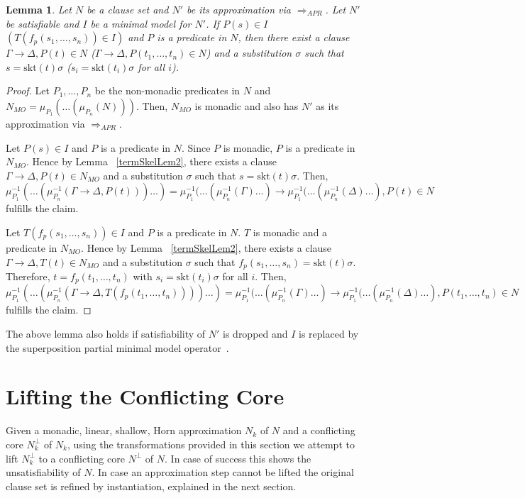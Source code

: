 \documentclass{llncs}
\newcommand{\imp}{\rightarrow}
\newcommand{\R}[1]{\mu^{-1}_{#1}}
\newcommand{\Proj}[1]{\mu_{#1}}
\newcommand{\skt}{\text{skt}}
\newcommand{\apr}{ \Rightarrow_{APR}}
\newtheorem{lem}[theorem]{Lemma}
\begin{document}
\begin{lem}\label{termSkelLem}
Let $N$ be a clause set and $N'$ be its approximation via  $\apr$. Let $N'$ be
satisfiable and $I$ be a minimal model for $N'$.
If $P(s) \in I$ $(T(f_p(s_1,\ldots,s_n))\in I)$ 
and $P$ is a predicate in $N$, then there exist a clause 
$\Gamma \imp \Delta,P(t) \in N$  ($\Gamma \imp \Delta,P(t_1,\ldots,t_n) \in N$)
and a substitution $\sigma$ such that
$s = \skt(t)\sigma$ ($s_i = \skt(t_i)\sigma$ for all $i$).
\end{lem}


\begin{proof}
Let $P_1,\ldots,P_n$ be the non-monadic predicates in $N$ and $N_{MO}=\Proj{P_1}(\ldots(\Proj{P_n}(N)))$. Then, $N_{MO}$ is monadic and also has $N'$ as its approximation via $\apr$.

 Let $P(s) \in I$ and $P$ is a predicate in $N$. Since $P$ is monadic, $P$ is a predicate in $N_{MO}$.
Hence by Lemma ~\ref{termSkelLem2}, there exists a clause $\Gamma \imp \Delta,P(t) \in N_{MO}$ 
and a substitution $\sigma$ such that $s = \skt(t)\sigma$. 
Then, $\R{P_1}(\ldots(\R{P_n}(\Gamma \imp \Delta,P(t)))\ldots)= \R{P_1}(\ldots(\R{P_n}(\Gamma)\ldots) \imp \R{P_1}(\ldots(\R{P_n}(\Delta)\ldots),P(t)\in N$ fulfills the claim.

Let $T(f_p(s_1,\ldots,s_n))\in I$ and $P$ is a predicate in $N$. $T$ is monadic and a predicate in $N_{MO}$.
Hence by Lemma ~\ref{termSkelLem2}, there exists a clause $\Gamma \imp \Delta,T(t) \in N_{MO}$ 
and a substitution $\sigma$ such that $f_p(s_1,\ldots,s_n) = \skt(t)\sigma$.
Therefore, $t=f_p(t_1,\ldots,t_n)$ with  $s_i = \skt(t_i)\sigma$ for all $i$.
Then, $\R{P_1}(\ldots(\R{P_n}(\Gamma \imp \Delta,T(f_p(t_1,\ldots,t_n))))\ldots)=\R{P_1}(\ldots(\R{P_n}(\Gamma)\ldots) \imp \R{P_1}(\ldots(\R{P_n}(\Delta)\ldots),P(t_1,\ldots,t_n) \in N$ fulfills the claim.
\end{proof}

The above lemma also holds if satisfiability of $N'$ is dropped and $I$ is replaced
by the superposition partial minimal model operator~\cite{Weidenbach01handbook}.


\section{Lifting the Conflicting Core} \label{sec:lifting}

Given a monadic, linear, shallow, Horn approximation $N_k$ of $N$ 
and a conflicting core $N^\bot_k$ of $N_k$, using the transformations
provided in this section we attempt to lift $N^\bot_k$ to a conflicting
core $N^\bot$ of $N$.
In case of success this shows the unsatisfiability of $N$.
In case an approximation step cannot be lifted the original clause
set is refined by instantiation, explained in the next section.
\end{document}
